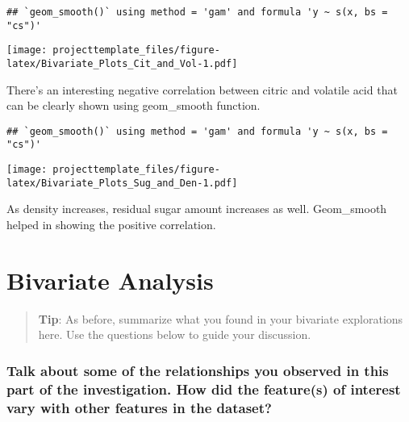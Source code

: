 \documentclass[]{article}
\newenvironment{Shaded}{\begin{snugshade}}{\end{snugshade}}
\newcommand{\KeywordTok}[1]{\textcolor[rgb]{0.13,0.29,0.53}{\textbf{#1}}}
\newcommand{\DataTypeTok}[1]{\textcolor[rgb]{0.13,0.29,0.53}{#1}}
\newcommand{\DecValTok}[1]{\textcolor[rgb]{0.00,0.00,0.81}{#1}}
\newcommand{\StringTok}[1]{\textcolor[rgb]{0.31,0.60,0.02}{#1}}
\newcommand{\OperatorTok}[1]{\textcolor[rgb]{0.81,0.36,0.00}{\textbf{#1}}}
\newcommand{\NormalTok}[1]{#1}
\begin{document}
\begin{verbatim}
## `geom_smooth()` using method = 'gam' and formula 'y ~ s(x, bs = "cs")'
\end{verbatim}

\texttt{[image: projecttemplate\_files/figure-latex/Bivariate\_Plots\_Cit\_and\_Vol-1.pdf]}

There's an interesting negative correlation between citric and volatile
acid that can be clearly shown using geom\_smooth function.

\begin{Shaded}
\end{Shaded}

\begin{verbatim}
## `geom_smooth()` using method = 'gam' and formula 'y ~ s(x, bs = "cs")'
\end{verbatim}

\texttt{[image: projecttemplate\_files/figure-latex/Bivariate\_Plots\_Sug\_and\_Den-1.pdf]}

As density increases, residual sugar amount increases as well.
Geom\_smooth helped in showing the positive correlation.

\section{Bivariate Analysis}\label{bivariate-analysis}

\begin{quote}
\textbf{Tip}: As before, summarize what you found in your bivariate
explorations here. Use the questions below to guide your discussion.
\end{quote}

\subsubsection{Talk about some of the relationships you observed in this
part of the investigation. How did the feature(s) of interest vary with
other features in the
dataset?}\label{talk-about-some-of-the-relationships-you-observed-in-this-part-of-the-investigation.-how-did-the-features-of-interest-vary-with-other-features-in-the-dataset}
\end{document}
